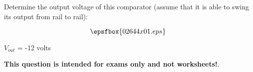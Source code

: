 

Determine the output voltage of this comparator (assume that it is able to swing its output from rail to rail):

$$\epsfbox{02644x01.eps}$$







$V_{out}$ = -12 volts







{\bf This question is intended for exams only and not worksheets!}.




